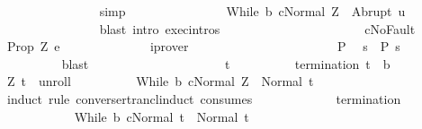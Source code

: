 \begin{isabellebody}
\ \ \ \ \ \ \ \ \ \ \ \ \ \ \isamarkupfalse%
\ simp\isanewline
\ \ \ \ \ \ \ \ \ \ \ \ \isamarkupfalse%
\ \isamarkupfalse%
\ {\isachardoublequoteopen}{\isasymGamma}{\isasymturnstile}{\isasymlangle}While\ b\ c{\isacharcomma}Normal\ Z{\isasymrangle}\ {\isasymRightarrow}\ Abrupt\ u{\isachardoublequoteclose}\isanewline
\ \ \ \ \ \ \ \ \ \ \ \ \ \ \isamarkupfalse%
\ {\isacharparenleft}blast\ intro{\isacharcolon}\ exec{\isachardot}intros{\isacharparenright}\isanewline
\ \ \ \ \ \ \ \ \ \ \isacommand{{\isacharbraceright}}\isamarkupfalse%
\isanewline
\ \ \ \ \ \ \ \ \ \ \isamarkupfalse%
\ cNoFault\ \isamarkupfalse%
\ {\isachardoublequoteopen}{\isacharquery}Prop\ Z\ e{\isachardoublequoteclose}\isanewline
\ \ \ \ \ \ \ \ \ \ \ \ \isamarkupfalse%
\ iprover\isanewline
\ \ \ \ \ \ \ \ \isamarkupfalse%
\isanewline
\ \ \ \ \ \ \isacommand{{\isacharbraceright}}\isamarkupfalse%
\isanewline
\ \ \ \ \ \ \isamarkupfalse%
\ P\ \isamarkupfalse%
\ {\isachardoublequoteopen}s\ {\isasymin}\ {\isacharquery}P{\isacharprime}\ s{\isachardoublequoteclose}\isanewline
\ \ \ \ \ \ \ \ \isamarkupfalse%
\ blast\isanewline
\ \ \ \ \isamarkupfalse%
\isanewline
\ \ \ \ \ \ \isacommand{{\isacharbraceleft}}\isamarkupfalse%
\isanewline
\ \ \ \ \ \ \ \ \isamarkupfalse%
\ t\isanewline
\ \ \ \ \ \ \ \ \isamarkupfalse%
\ {\isachardoublequoteopen}termination{\isachardoublequoteclose}{\isacharcolon}\ {\isachardoublequoteopen}t\ {\isasymnotin}\ b{\isachardoublequoteclose}\isanewline
\ \ \ \ \ \ \ \ \isamarkupfalse%
\ {\isachardoublequoteopen}{\isacharparenleft}Z{\isacharcomma}\ t{\isacharparenright}\ {\isasymin}\ {\isacharquery}unroll{\isachardoublequoteclose}\isanewline
\ \ \ \ \ \ \ \ \isamarkupfalse%
\ {\isachardoublequoteopen}{\isasymGamma}{\isasymturnstile}{\isasymlangle}While\ b\ c{\isacharcomma}Normal\ Z{\isasymrangle}\ {\isasymRightarrow}\ Normal\ t{\isachardoublequoteclose}\isanewline
\ \ \ \ \ \ \ \ \isamarkupfalse%
\ {\isacharparenleft}induct\ rule{\isacharcolon}\ converse{\isacharunderscore}rtrancl{\isacharunderscore}induct\ {\isacharbrackleft}consumes\ {}{\isacharbrackright}{\isacharparenright}\isanewline
\ \ \ \ \ \ \ \ \ \ \isamarkupfalse%
\ {\isachardoublequoteopen}termination{\isachardoublequoteclose}\ \isanewline
\ \ \ \ \ \ \ \ \ \ \isamarkupfalse%
\ {\isachardoublequoteopen}{\isasymGamma}{\isasymturnstile}{\isasymlangle}While\ b\ c{\isacharcomma}Normal\ t{\isasymrangle}\ {\isasymRightarrow}\ Normal\ t{\isachardoublequoteclose}\isanewline

\end{isabellebody}
